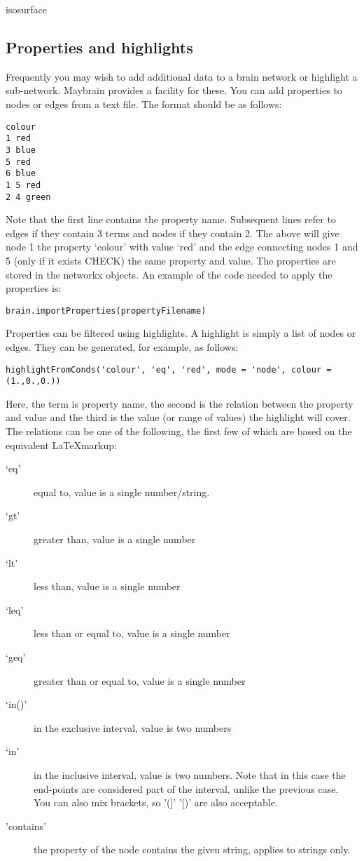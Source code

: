 \documentclass{report}
\begin{document}
isosurface

\subsection{Properties and highlights}
Frequently you may wish to add additional data to a brain network or highlight a sub-network. Maybrain provides a facility for these. You can add properties to nodes or edges from a text file. The format should be as follows:

\begin{verbatim}
colour
1 red
3 blue
5 red
6 blue
1 5 red
2 4 green
\end{verbatim}

\noindent Note that the first line contains the property name. Subsequent lines refer to edges if they contain 3 terms and nodes if they contain 2. The above will give node 1 the property `colour' with value `red' and the edge connecting nodes 1 and 5 (only if it exists CHECK) the same property and value. The properties are stored in the networkx objects. An example of the code needed to apply the properties is:

\begin{verbatim}
brain.importProperties(propertyFilename)
\end{verbatim}

Properties can be filtered using highlights. A highlight is simply a list of nodes or edges. They can be generated, for example, as follows:

\begin{verbatim}
highlightFromConds('colour', 'eq', 'red', mode = 'node', colour = (1.,0.,0.))
\end{verbatim}

\noindent Here, the term is property name, the second is the relation between the property and value and the third is the value (or range of values) the highlight will cover. The relations can be one of the following, the first few of which are based on the equivalent \LaTeX  markup:

\begin{description}
\item[`eq'] equal to, value is a single number/string.
\item[`gt'] greater than, value is a single number
\item[`lt'] less than, value is a single number
\item[`leq'] less than or equal to, value is a single number
\item[`geq'] greater than or equal to, value is a single number
\item[`in()'] in the exclusive interval, value is two numbers
\item[`in\lbrack\rbrack'] in the inclusive interval, value is two numbers. Note that in this case the end-points are considered part of the interval, unlike the previous case. You can also mix brackets, so '(]' '[)' are also acceptable.
\item['contains'] the property of the node contains the given string, applies to strings only.
\end{description} 
\end{document}
